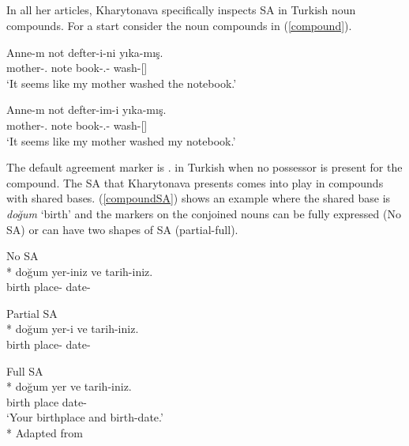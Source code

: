 \subsection{\citet{kharytonava2011morphology,kharytonava2012taming,kharytonava2012word}}

In all her articles, Kharytonava specifically inspects SA in Turkish noun compounds. For a start consider the noun compounds in (\ref{compound}).

\begin{exe}
    \ex \label{compound}
    \begin{xlist}
        \ex \gll Anne-m not defter-i-ni yıka-mış. \\
        mother-{\Poss}.{\Fsg} note book-{\Poss}.{\Tsg}-{\Acc} wash-{\Prf}[{\Tsg}] \\
        \glt `It seems like my mother washed the notebook.'
        
        \ex \gll Anne-m not defter-im-i yıka-mış. \\
        mother-{\Poss}.{\Fsg} note book-{\Poss}.{\Fsg}-{\Acc} wash-{\Prf}[{\Tsg}] \\
        \glt `It seems like my mother washed my notebook.'
    \end{xlist}
\end{exe}

The default agreement marker is {\Poss.\Tsg} in Turkish when no possessor is present for the compound. The SA that Kharytonava presents comes into play in compounds with shared bases. (\ref{compoundSA}) shows an example where the shared base is \textit{doğum} `birth' and the markers on the conjoined nouns can be fully expressed (No SA) or can have two shapes of SA (partial-full).

\begin{exe}
    \ex \label{compoundSA}
    \begin{xlist}
        \ex No SA\\*
        \gll doğum yer-iniz ve tarih-iniz. \\ 
        birth place-{\Spl} {\And} date-{\Spl} \\
        \glt ${}$
        
        \ex \label{compoundSAc} Partial SA\\*
        \gll doğum yer-i ve tarih-iniz. \\ 
        birth place-{\Tsg} {\And} date-{\Spl} \\
        \glt ${}$
        
        \ex \label{compoundSAb} Full SA\\*
        \gll doğum yer ve tarih-iniz. \\ 
        birth place {\And} date-{\Spl} \\
        \glt `Your birthplace and birth-date.'\\*
        \hfill Adapted from \citet{kharytonava2012taming}
    \end{xlist}
\end{exe}

